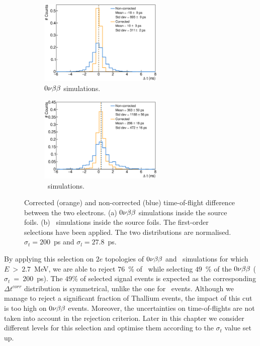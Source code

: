 \begin{figure}[!h]
\centering
\begin{subfigure}[t]{1.\textwidth}
  \centering
  \includegraphics[width=0.65\textwidth]{timedifference/fig_timediff/0nubb_delta_t.eps}
  \captionsetup{justification=justified}
  \caption{$0\nu\beta\beta$ simulations.
    \label{subfig:0nubb_delta_t}}
\end{subfigure}
\hfill
\begin{subfigure}[t]{1.\textwidth}
  \centering
  \includegraphics[width=0.65\textwidth]{timedifference/fig_timediff/208Tl_delta_t.eps}
  \captionsetup{justification=justified}
  \caption{\Tl\ simulations.
    \label{subfig:208Tl_delta_t}}
\end{subfigure}
\caption{Corrected (orange) and non-corrected (blue) time-of-flight difference between the two electrons.
  (a) $0\nu\beta\beta$ simulations inside the source foils.
  (b) \Tl\ simulations inside the source foils.
  The first-order selections have been applied.
  The two distributions are normalised.
  $\sigma_{t}=200$~ps and $\sigma_{l}=27.8$~ps.
  \label{fig:delta_t}}
\end{figure}

By applying this selection on $2e$ topologies of $0\nu\beta\beta$ and \Tl\ simulations for which $E~>~2.7$~MeV, we are able to reject $76$~\% of \Tl\, while selecting $49$~\% of the $0\nu\beta\beta$ ($\sigma_{t}~=~200$~ps).
The $49$\% of selected signal events is expected as the corresponding $\Delta t^{corr}$ distribution is symmetrical, unlike the one for \Tl\ events.
Although we manage to reject a significant fraction of Thallium events, the impact of this cut is too high on $0\nu\beta\beta$ events.
Moreover, the uncertainties on time-of-flights are not taken into account in the rejection criterion.
Later in this chapter we consider different levels for this selection and optimise them according to the $\sigma_{t}$ value set up.

